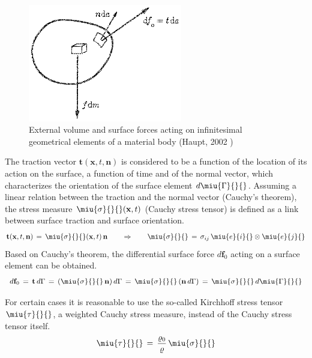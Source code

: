 \begin{figure}[htb!]
\begin{center}
\footnotesize
\includegraphics[width=0.6\textwidth]{figures/ext_forces.eps}
\caption{External volume and surface forces acting on infinitesimal geometrical elements of a material body (Haupt, 2002 \cite{Haupt:2002})}
\label{fig:ext_forces}
\end{center}
\end{figure}

The traction vector $\mathbf{t}(\mathbf{x},t,\mathbf{n})$ is considered to be a function of the location of its action on the surface, a function of time and of the normal vector, which characterizes the orientation of the surface element $d\miu{\Gamma}{}{}$. Assuming a linear relation between the traction and the normal vector (Cauchy's theorem), the stress measure $\miu{\sigma}{}{}(\mathbf{x},t)$ (Cauchy stress tensor) is defined as a link between surface traction and surface orientation. 
\begin{equation}
\mathbf{t}(\mathbf{x},t,\mathbf{n})\,=\,\miu{\sigma}{}{}(\mathbf{x},t)\,\mathbf{n}
\qquad\Rightarrow\qquad
\miu{\sigma}{}{}\,=\,\sigma_{ij}\,\miu{e}{i}{}\otimes\miu{e}{j}{}
\label{eq:cauchy_theorem}
\end{equation}
Based on Cauchy's theorem, the differential surface force $d\mathbf{f}_0$ acting on a surface element can be obtained. 
\begin{equation}
d\mathbf{f}_0\,=\,\mathbf{t}\,d\Gamma\,=\,(\miu{\sigma}{}{}\,\mathbf{n})\,d\Gamma\,=\,
\miu{\sigma}{}{}\,(\mathbf{n}\,d\Gamma)\,=\,\miu{\sigma}{}{}\,d\miu{\Gamma}{}{}
\label{eq:differ_surforce}
\end{equation}

For certain cases it is reasonable to use the so-called Kirchhoff stress tensor $\miu{\tau}{}{}$, a weighted Cauchy stress measure, instead of the Cauchy stress tensor itself.
\begin{equation}
\miu{\tau}{}{}\,=\,\frac{\varrho_0}{\varrho}\,\miu{\sigma}{}{}
\end{equation}

